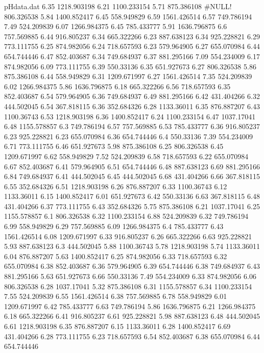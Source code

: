 \begin{filecontents}{pHdata.dat}
6.35	1218.903198
6.21	1100.233154
5.71	875.386108
#NULL!	806.326538
5.84	1400.852417
6.45	558.949829
6.59	1561.426514
6.57	749.786194
7.49	524.209839
6.07	1266.984375
6.45	785.433777
5.91	1636.796875
6.6	757.569885
6.44	916.805237
6.34	665.322266
6.23	887.638123
6.34	925.228821
6.29	773.111755
6.25	874.982056
6.24	718.657593
6.23	579.964905
6.27	655.070984
6.44	654.744446
6.47	852.403687
6.34	749.684937
6.37	881.295166
7.09	554.234009
6.17	874.982056
6.09	773.111755
6.39	550.33136
6.35	651.927673
6.27	806.326538
5.86	875.386108
6.44	558.949829
6.31	1209.671997
6.27	1561.426514
7.35	524.209839
6.02	1266.984375
5.86	1636.796875
6.18	665.322266
6.56	718.657593
6.35	852.403687
6.54	579.964905
6.36	749.684937
6.49	881.295166
6.42	431.404266
6.32	444.502045
6.54	367.818115
6.36	352.684326
6.28	1133.36011
6.35	876.887207
6.43	1100.36743
6.53	1218.903198
6.36	1400.852417
6.24	1100.233154
6.47	1037.17041
6.48	1155.578857
6.3	749.786194
6.57	757.569885
6.53	785.433777
6.36	916.805237
6.23	925.228821
6.23	655.070984
6.36	654.744446
6.4	550.33136
7.39	554.234009
6.71	773.111755
6.46	651.927673
5.98	875.386108
6.25	806.326538
6.45	1209.671997
6.62	558.949829
7.52	524.209839
6.58	718.657593
6.22	655.070984
6.67	852.403687
6.41	579.964905
6.51	654.744446
6.48	887.638123
6.69	881.295166
6.84	749.684937
6.41	444.502045
6.45	444.502045
6.68	431.404266
6.66	367.818115
6.55	352.684326
6.51	1218.903198
6.26	876.887207
6.33	1100.36743
6.12	1133.36011
6.15	1400.852417
6.01	651.927673
6.42	550.33136
6.63	367.818115
6.48	431.404266
6.37	773.111755
6.43	352.684326
5.75	875.386108
6.21	1037.17041
6.25	1155.578857
6.1	806.326538
6.32	1100.233154
6.88	524.209839
6.32	749.786194
6.99	558.949829
6.29	757.569885
6.09	1266.984375
6.4	785.433777
6.43	1561.426514
6.08	1209.671997
6.33	916.805237
6.26	665.322266
6.63	925.228821
5.93	887.638123
6.3	444.502045
5.88	1100.36743
5.78	1218.903198
5.74	1133.36011
6.04	876.887207
5.63	1400.852417
6.25	874.982056
6.33	718.657593
6.32	655.070984
6.38	852.403687
6.36	579.964905
6.39	654.744446
6.38	749.684937
6.43	881.295166
5.63	651.927673
6.66	550.33136
7.49	554.234009
6.33	874.982056
6.06	806.326538
6.28	1037.17041
5.32	875.386108
6.31	1155.578857
6.34	1100.233154
7.55	524.209839
6.55	1561.426514
6.38	757.569885
6.78	558.949829
6.01	1209.671997
6.42	785.433777
6.63	749.786194
5.86	1636.796875
6.21	1266.984375
6.18	665.322266
6.41	916.805237
6.61	925.228821
5.98	887.638123
6.48	444.502045
6.61	1218.903198
6.35	876.887207
6.15	1133.36011
6.28	1400.852417
6.69	431.404266
6.28	773.111755
6.23	718.657593
6.54	852.403687
6.38	655.070984
6.44	654.744446

\end{filecontents}
